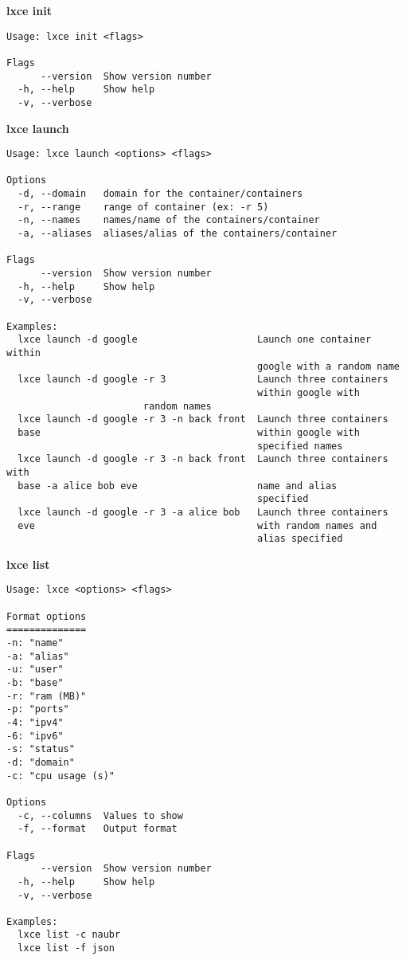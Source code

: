 \textbf{lxce init}
\begin{verbatim}
Usage: lxce init <flags>

Flags
      --version  Show version number                            
  -h, --help     Show help                                      
  -v, --verbose
\end{verbatim}

\newpage
\textbf{lxce launch}
\begin{verbatim}
Usage: lxce launch <options> <flags>

Options
  -d, --domain   domain for the container/containers         
  -r, --range    range of container (ex: -r 5)             
  -n, --names    names/name of the containers/container                  
  -a, --aliases  aliases/alias of the containers/container               

Flags
      --version  Show version number                                   
  -h, --help     Show help                                             
  -v, --verbose

Examples:
  lxce launch -d google                     Launch one container within 
                                            google with a random name
  lxce launch -d google -r 3                Launch three containers 
                                            within google with 
					    random names
  lxce launch -d google -r 3 -n back front  Launch three containers 
  base                                      within google with 
                                            specified names
  lxce launch -d google -r 3 -n back front  Launch three containers with 
  base -a alice bob eve                     name and alias
                                            specified
  lxce launch -d google -r 3 -a alice bob   Launch three containers 
  eve                                       with random names and 
                                            alias specified
\end{verbatim}

\newpage
\textbf{lxce list}
\begin{verbatim}
Usage: lxce <options> <flags>

Format options
==============
-n: "name"
-a: "alias"
-u: "user"
-b: "base"
-r: "ram (MB)"
-p: "ports"
-4: "ipv4"
-6: "ipv6"
-s: "status"
-d: "domain"
-c: "cpu usage (s)"

Options
  -c, --columns  Values to show                                         
  -f, --format   Output format                                          

Flags
      --version  Show version number                                   
  -h, --help     Show help                                             
  -v, --verbose

Examples:
  lxce list -c naubr
  lxce list -f json
\end{verbatim}


